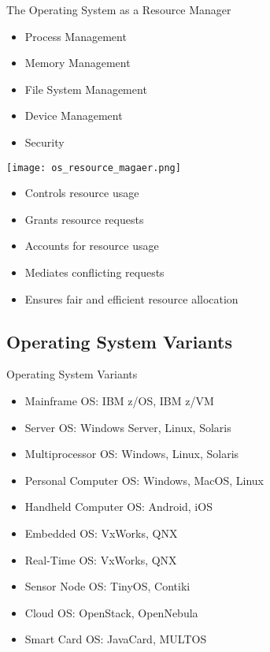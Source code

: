 \begin{concept}{The Operating System as a Resource Manager}
    \begin{itemize}
        \item Process Management
        \item Memory Management
        \item File System Management
        \item Device Management
        \item Security
    \end{itemize}
    \texttt{[image: os\_resource\_magaer.png]}
    \begin{itemize}
        \item Controls resource usage
        \item Grants resource requests
        \item Accounts for resource usage
        \item Mediates conflicting requests
        \item Ensures fair and efficient resource allocation
    \end{itemize}
\end{concept}

\multend

\raggedcolumns

\subsection{Operating System Variants}


\begin{theorem}{Operating System Variants}
    \begin{itemize}
        \item Mainframe OS: IBM z/OS, IBM z/VM
        \item Server OS: Windows Server, Linux, Solaris
        \item Multiprocessor OS: Windows, Linux, Solaris
        \item Personal Computer OS: Windows, MacOS, Linux
        \item Handheld Computer OS: Android, iOS
        \item Embedded OS: VxWorks, QNX
        \item Real-Time OS: VxWorks, QNX
        \item Sensor Node OS: TinyOS, Contiki
        \item Cloud OS: OpenStack, OpenNebula
        \item Smart Card OS: JavaCard, MULTOS
    \end{itemize}
\end{theorem}

